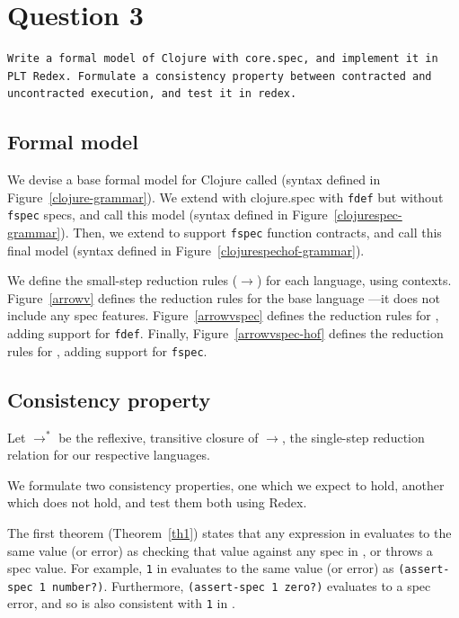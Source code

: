 \section{Question 3}

\begin{verbatim}
Write a formal model of Clojure with core.spec, and implement it in
PLT Redex. Formulate a consistency property between contracted and
uncontracted execution, and test it in redex.
\end{verbatim}

\subsection{Formal model}

%

We devise a base formal model for Clojure called \lambdac{}
(syntax defined in Figure~\ref{clojure-grammar}).
We extend \lambdac{} with clojure.spec with \texttt{fdef} but without 
\texttt{fspec} specs, and call
this model \lambdacs{}
(syntax defined in Figure~\ref{clojurespec-grammar}).
Then, we extend \lambdacs{} to support
\texttt{fspec} function contracts, and call this final model \lambdacsf{}
(syntax defined in Figure~\ref{clojurespechof-grammar}).

We define the small-step reduction rules ($\rightarrow$) for each language, using contexts.
Figure~\ref{arrowv} defines the reduction rules for 
the base language \lambdac{}---it does not include any spec features.
Figure~\ref{arrowvspec} defines the reduction rules for 
\lambdacs{}, adding support for \texttt{fdef}.
Finally, Figure~\ref{arrowvspec-hof} defines the reduction rules for 
\lambdacsf{}, adding support for \texttt{fspec}.

\subsection{Consistency property}

Let $\rightarrow^{*}$ be the reflexive, transitive closure of $\rightarrow$,
the single-step reduction relation for our respective languages.

We formulate two consistency properties, one which we expect to hold, another
which does not hold, and test them both using Redex.

The first theorem (Theorem~\ref{th1}) states that any expression in \lambdac{}
evaluates to the same value (or error) as checking that value against
any spec in \lambdacs{}, or throws a spec value.
For example, \texttt{1} in \lambdac{} evaluates to the same value (or error)
as \texttt{(assert-spec 1 number?)}. Furthermore, \texttt{(assert-spec 1 zero?)} 
evaluates to a spec error, and so is also consistent with \texttt{1}
in \lambdac{}.

